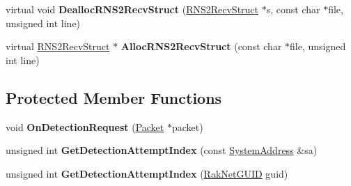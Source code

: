 \begin{DoxyCompactItemize}
\item 
\hypertarget{class_rak_net_1_1_nat_type_detection_server_a72e42dff56ac4016c809f04a83f4255b}{virtual void {\bfseries Dealloc\-R\-N\-S2\-Recv\-Struct} (\hyperlink{struct_rak_net_1_1_r_n_s2_recv_struct}{R\-N\-S2\-Recv\-Struct} $\ast$s, const char $\ast$file, unsigned int line)}\label{class_rak_net_1_1_nat_type_detection_server_a72e42dff56ac4016c809f04a83f4255b}

\item 
\hypertarget{class_rak_net_1_1_nat_type_detection_server_a71ef6b85df6b0a8f67e057d4254803fd}{virtual \hyperlink{struct_rak_net_1_1_r_n_s2_recv_struct}{R\-N\-S2\-Recv\-Struct} $\ast$ {\bfseries Alloc\-R\-N\-S2\-Recv\-Struct} (const char $\ast$file, unsigned int line)}\label{class_rak_net_1_1_nat_type_detection_server_a71ef6b85df6b0a8f67e057d4254803fd}

\end{DoxyCompactItemize}
\subsection*{Protected Member Functions}
\begin{DoxyCompactItemize}
\item 
\hypertarget{class_rak_net_1_1_nat_type_detection_server_ad3e3d567d92b6659f2cdef4738e979af}{void {\bfseries On\-Detection\-Request} (\hyperlink{struct_rak_net_1_1_packet}{Packet} $\ast$packet)}\label{class_rak_net_1_1_nat_type_detection_server_ad3e3d567d92b6659f2cdef4738e979af}

\item 
\hypertarget{class_rak_net_1_1_nat_type_detection_server_a033c3b10f3238fd65a707e7dd9f6c5e9}{unsigned int {\bfseries Get\-Detection\-Attempt\-Index} (const \hyperlink{struct_rak_net_1_1_system_address}{System\-Address} \&sa)}\label{class_rak_net_1_1_nat_type_detection_server_a033c3b10f3238fd65a707e7dd9f6c5e9}

\item 
\hypertarget{class_rak_net_1_1_nat_type_detection_server_a1319527cb180f98080cb7e300f66125e}{unsigned int {\bfseries Get\-Detection\-Attempt\-Index} (\hyperlink{struct_rak_net_1_1_rak_net_g_u_i_d}{Rak\-Net\-G\-U\-I\-D} guid)}\label{class_rak_net_1_1_nat_type_detection_server_a1319527cb180f98080cb7e300f66125e}

\end{DoxyCompactItemize}
